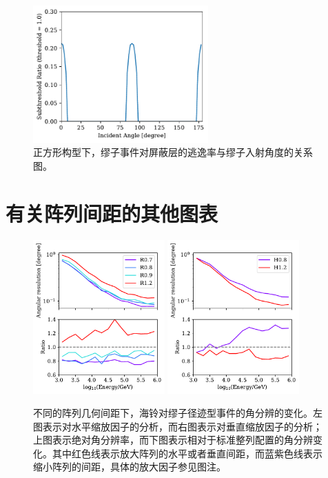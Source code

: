 \begin{figure}[!htb]%
    \centering
    \includegraphics[width=0.60\textwidth]{img/corridor_angle_cube.pdf}
    \caption{正方形构型下，缪子事件对屏蔽层的逃逸率与缪子入射角度的关系图。}
    \label{fig:corridor_angle_cube}
\end{figure}

\section{有关阵列间距的其他图表}

\begin{figure}[!htb]%
    \centering
    \includegraphics[width=0.45\textwidth]{img/spacing/angular_resuolution_hori.pdf}
    \includegraphics[width=0.45\textwidth]{img/spacing/angular_resuolution_vert.pdf}
    \caption{不同的阵列几何间距下，海铃对缪子径迹型事件的角分辨的变化。左图表示对水平缩放因子的分析，而右图表示对垂直缩放因子的分析；上图表示绝对角分辨率，而下图表示相对于标准整列配置的角分辨变化。其中红色线表示放大阵列的水平或者垂直间距，而蓝紫色线表示缩小阵列的间距，具体的放大因子参见图注。}
    \label{fig:spacing_angular_resuolution}
\end{figure}


